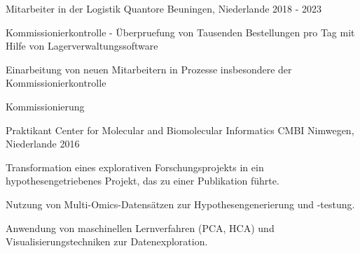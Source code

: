 

\begin{cventries}

  \cventry
    {Mitarbeiter in der Logistik} %
    {Quantore} %
    {Beuningen, Niederlande} %
    {2018 - 2023} %
    {
      \begin{cvitems} %
        \item {Kommissionierkontrolle - Überpruefung von Tausenden Bestellungen pro Tag mit Hilfe von Lagerverwaltungssoftware}
        \item {Einarbeitung von neuen Mitarbeitern in Prozesse insbesondere der Kommissionierkontrolle}
        \item {Kommissionierung}
        \vspace{0.2cm}
        \newline{}  
      \end{cvitems}
    }

  \cventry
    {Praktikant} %
    {Center for Molecular and Biomolecular Informatics CMBI} %
    {Nimwegen, Niederlande} %
    {2016} %
    {
      \begin{cvitems} %
        \item {Transformation eines explorativen Forschungsprojekts in ein hypothesengetriebenes Projekt, das zu einer Publikation führte.}
        \item {Nutzung von Multi-Omics-Datensätzen zur Hypothesengenerierung und -testung.}
        \item {Anwendung von maschinellen Lernverfahren (PCA, HCA) und Visualisierungstechniken zur Datenexploration.}
        \vspace{0.2cm}
        \newline{}    
          
      \end{cvitems}
    }


\end{cventries}
